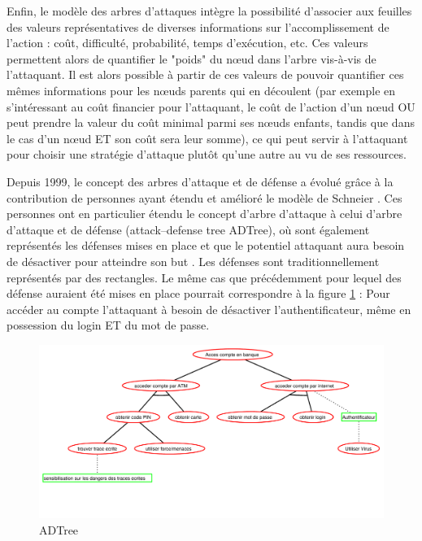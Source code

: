         Enfin, le modèle des arbres d'attaques intègre la possibilité d'associer aux feuilles des valeurs représentatives de diverses informations sur l'accomplissement de l'action : coût, difficulté, probabilité, temps d'exécution, etc. Ces valeurs permettent alors de quantifier le "poids" du nœud dans l'arbre vis-à-vis de l'attaquant.  Il est alors possible à partir de ces valeurs de pouvoir quantifier ces mêmes informations pour les nœuds parents qui en découlent (par exemple en s'intéressant au coût financier pour l'attaquant, le coût de l'action d'un nœud OU peut prendre la valeur du coût minimal parmi ses nœuds enfants, tandis que dans le cas d'un nœud ET son coût sera leur somme), ce qui peut servir à l'attaquant pour choisir une stratégie d'attaque plutôt qu'une autre au vu de ses ressources.		

		Depuis 1999, le concept des arbres d'attaque et de défense a évolué grâce à la contribution de personnes ayant étendu et amélioré le modèle de Schneier \cite{ADTreeKordy}. Ces personnes ont en particulier étendu le concept d'arbre d'attaque à celui d’arbre d’attaque et de défense (attack–defense tree ADTree), où sont également représentés les défenses mises en place et que le potentiel attaquant aura besoin de désactiver pour atteindre son but \cite{ADTreeOxford}. Les défenses sont traditionnellement représentés par des rectangles. Le même cas que précédemment pour lequel des défense auraient été mises en place pourrait correspondre à la figure \ref{fig:arbre_exemple_2} : Pour accéder au compte l'attaquant à besoin de désactiver l'authentificateur, même en possession du login ET du mot de passe.

        \begin{figure}
            \begin{center}
                \includegraphics[width=1\textwidth]{figure/exemple2_rapport.pdf}
            \end{center}
            \caption{ADTree}
            \label{fig:arbre_exemple_2}
        \end{figure}

